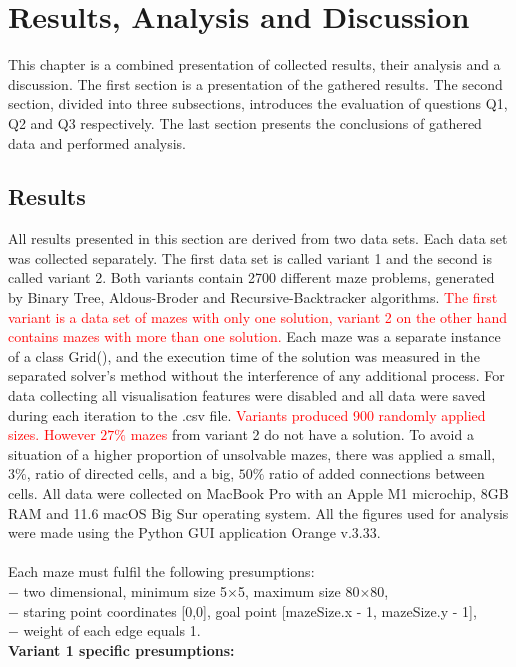 \chapter{Results, Analysis and Discussion}\label{cha:Results Analysis and Discussion}
This chapter is a combined presentation of collected results, their analysis and a discussion. The first section is a presentation of the gathered results. 
The second section, divided into three subsections, introduces the evaluation of questions Q1, Q2 and Q3 respectively. The last section presents the 
conclusions of gathered data and performed analysis. 
\section{Results}
All results presented in this section are derived from two data sets. Each data set was collected separately. The first data set is called variant 1 and the second is 
called variant 2. Both variants contain 2700 different maze problems, generated by Binary Tree, Aldous-Broder and Recursive-Backtracker
algorithms. \textcolor{red}{The first variant is a data set of mazes with only one solution, variant 2 on the other hand contains mazes with more than one solution.} 
Each maze was a separate instance of a class Grid(), and the execution time of the solution was measured in the separated solver's method without the interference of
any additional process. For data collecting all visualisation features were disabled and all data were saved during each iteration to the .csv file.
\textcolor{red}{Variants produced  900 randomly applied sizes. However $27\%$ mazes} from variant 2 do not have a solution. To avoid a situation of a higher 
proportion of unsolvable mazes, there was applied a small, $3\%$, ratio of directed cells, and a big, $50\%$ ratio of added connections between cells.
All data were collected on
MacBook Pro with an Apple M1 microchip, 8GB RAM and 11.6 macOS Big Sur operating system. All the figures used for analysis were made using the Python GUI application Orange v.3.33.\\
\\
Each maze must fulfil the following presumptions:\\
$-$ two dimensional, minimum size 5$\times$5, maximum size 80$\times$80,\\
$-$ staring point coordinates [0,0], goal point [mazeSize.x - 1, mazeSize.y - 1],\\
$-$ weight of each edge equals 1.\\
\textbf{Variant 1 specific presumptions: }\\
